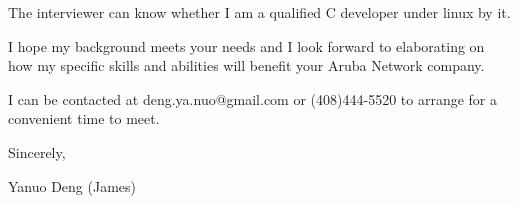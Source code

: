 The interviewer can know whether I am a qualified C developer under linux by it.

{ \bigbreak } 
I hope my background meets your needs and I look
forward to elaborating on how my specific skills and abilities will benefit your Aruba Network company.

{ \bigbreak } 
I can be contacted at deng.ya.nuo@gmail.com
or (408)444-5520 to arrange for a convenient time to meet.

{ \bigbreak } 




\vskip 60pt

{ \bigbreak } 
Sincerely,

Yanuo Deng (James)

\bye
